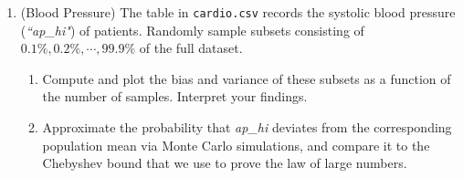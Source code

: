 \documentclass[12pt,twoside]{article}
\begin{document}
\begin{enumerate}
\item (Blood Pressure) The table in \texttt{cardio.csv} records the systolic blood pressure (\textit{``ap\_hi"}) of patients. Randomly sample subsets consisting of $0.1\%, 0.2\%, \cdots, 99.9\%$ of the full dataset. 
\begin{enumerate}
\item Compute and plot the bias and variance of these subsets as a function of the number of samples. Interpret your findings.
\item Approximate the probability that \textit{ap\_hi} deviates from the corresponding population mean via Monte Carlo simulations, and compare it to the Chebyshev bound that we use to prove the law of large numbers.
\end{enumerate}
\end{enumerate}
\end{document}

